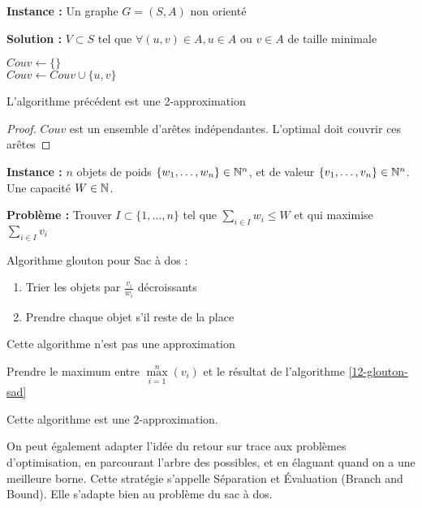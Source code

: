 \begin{definition}\enspace
	
	\textbf{Instance :} Un graphe $G = (S, A)$ non orienté
	
	\textbf{Solution :} $V \subset S$ tel que $\forall (u,v) \in A, u \in A \text{ ou } v \in A$ de taille minimale
\end{definition}

\begin{algorithm}
	\caption{$Couverture\_par\_sommets\_glouton(G)$}
	$Couv \gets \{\}$\\
	{
		$Couv \gets Couv \cup \{u,v\}$
	}
\end{algorithm}

\begin{proposition}
	L'algorithme précédent est une 2-approximation
\end{proposition}
\begin{proof}
	$Couv$ est un ensemble d'arêtes indépendantes. L'optimal doit couvrir ces arêtes
\end{proof}

\begin{definition}\enspace
	
	\textbf{Instance :} $n$ objets de poids $\{w_1, \dots, w_n\} \in \mathbb{N}^n$, et de valeur $\{v_1, \dots, v_n\}\in \mathbb{N}^n$. Une capacité $W \in \mathbb{N}$.
	
	\textbf{Problème :} Trouver $I \subset \{1, \dots, n\}$ tel que $\sum\limits_{i \in I} w_i \leq W$ et qui maximise $\sum\limits_{i\in I} v_i$
\end{definition}

\begin{algo}Algorithme glouton pour Sac à dos :
	\label{12-glouton-sad}
	\begin{enumerate}
		\item Trier les objets par $\frac{v_i}{w_i}$ décroissants
		\item Prendre chaque objet s'il reste de la place
	\end{enumerate}
\end{algo}

\begin{proposition}
	Cette algorithme n'est pas une approximation
\end{proposition}

\begin{algo}
	Prendre le maximum entre $\max\limits_{i = 1}^n \left(v_i\right)$ et le résultat de l'algorithme \ref{12-glouton-sad}
\end{algo}

\begin{proposition}
	Cette algorithme est une 2-approximation.
\end{proposition}

\begin{rem}
	On peut également adapter l'idée du retour sur trace aux problèmes d'optimisation, en parcourant l'arbre des possibles, et en élaguant quand on a une meilleure borne. Cette stratégie s'appelle Séparation et Évaluation (Branch and Bound). Elle s'adapte bien au problème du sac à dos.
\end{rem}